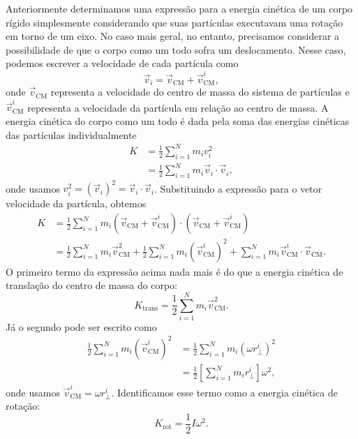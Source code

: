 Anteriormente determinamos uma expressão para a energia cinética de um corpo rígido simplesmente considerando que suas partículas executavam uma rotação em torno de um eixo. No caso mais geral, no entanto, precisamos considerar a possibilidade de que o corpo como um todo sofra um deslocamento. Nesse caso, podemos escrever a velocidade de cada partícula como
\begin{equation}
    \vec{v}_i = \vec{v}_{\text{CM}} + \vec{v}^i_{\text{CM}},
\end{equation}
%
onde $\vec{v}_{\text{CM}}$ representa a velocidade do centro de massa do sistema de partículas e $\vec{v}^i_{\text{CM}}$ representa a velocidade da partícula em relação ao centro de massa. A energia cinética do corpo como um todo é dada pela soma das energias cinéticas das partículas individualmente
\begin{align}
    K &= \frac{1}{2}\sum_{i = 1}^{N} m_i v_i^2 \\
    &= \frac{1}{2}\sum_{i = 1}^{N} m_i \vec{v}_i \cdot \vec{v}_i,
\end{align}
%
onde usamos $v_i^2 = (\vec{v}_i)^2 = \vec{v}_i\cdot\vec{v}_i$. Substituindo a expressão para o vetor velocidade da partícula, obtemos
\begin{align}
    K &= \frac{1}{2}\sum_{i = 1}^N m_i (\vec{v}_{\text{CM}} + \vec{v}^i_{\text{CM}})\cdot (\vec{v}_{\text{CM}} + \vec{v}^i_{\text{CM}}) \\
    &= \frac{1}{2}\sum_{i = 1}^N m_i \vec{v}_{\text{CM}}^2 + \frac{1}{2}\sum_{i = 1}^N m_i (\vec{v}^i_{\text{CM}})^2 + \sum_{i=1}^N m_i \vec{v}^i_{\text{CM}} \cdot \vec{v}_{\text{CM}}.
\end{align}
%
O primeiro termo da expressão acima nada mais é do que a energia cinética de translação do centro de massa do corpo:
\begin{equation}
    K_{\text{trans}} = \frac{1}{2}\sum_{i = 1}^N m_i \vec{v}_{\text{CM}}^2.
\end{equation}
%
Já o segundo pode ser escrito como
\begin{align}
    \frac{1}{2}\sum_{i = 1}^N m_i (\vec{v}^i_{\text{CM}})^2 &= \frac{1}{2}\sum_{i = 1}^N m_i (\omega r_\perp^i)^2 \\
    &= \frac{1}{2} \left[\sum_{i=1}^N m_i r_\perp^i\right]\omega^2,
\end{align}
%
onde usamos $\vec{v}^i_{\text{CM}} = \omega r_\perp^i$. Identificamos esse termo como a energia cinética de rotação:
\begin{equation}
    K_{\text{rot}} = \frac{1}{2} I\omega^2.
\end{equation}

